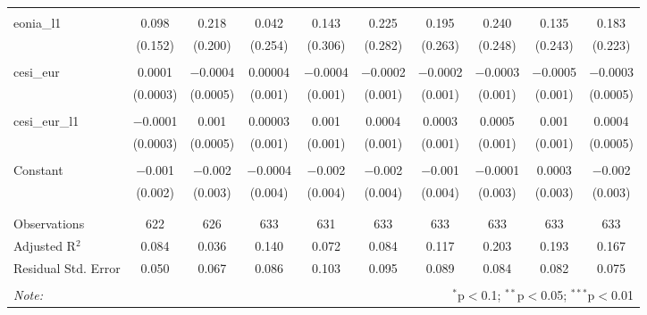 \begin{table}[!htbp]
\begin{adjustbox}{width=1.35\textwidth}
\begin{tabular}{@{\extracolsep{5pt}}lccccccccc}
  & & & & & & & & & \\ 
 eonia\_l1 & 0.098 & 0.218 & 0.042 & 0.143 & 0.225 & 0.195 & 0.240 & 0.135 & 0.183 \\ 
  & (0.152) & (0.200) & (0.254) & (0.306) & (0.282) & (0.263) & (0.248) & (0.243) & (0.223) \\ 
  & & & & & & & & & \\ 
 cesi\_eur & 0.0001 & $-$0.0004 & 0.00004 & $-$0.0004 & $-$0.0002 & $-$0.0002 & $-$0.0003 & $-$0.0005 & $-$0.0003 \\ 
  & (0.0003) & (0.0005) & (0.001) & (0.001) & (0.001) & (0.001) & (0.001) & (0.001) & (0.0005) \\ 
  & & & & & & & & & \\ 
 cesi\_eur\_l1 & $-$0.0001 & 0.001 & 0.00003 & 0.001 & 0.0004 & 0.0003 & 0.0005 & 0.001 & 0.0004 \\ 
  & (0.0003) & (0.0005) & (0.001) & (0.001) & (0.001) & (0.001) & (0.001) & (0.001) & (0.0005) \\ 
  & & & & & & & & & \\ 
 Constant & $-$0.001 & $-$0.002 & $-$0.0004 & $-$0.002 & $-$0.002 & $-$0.001 & $-$0.0001 & 0.0003 & $-$0.002 \\ 
  & (0.002) & (0.003) & (0.004) & (0.004) & (0.004) & (0.004) & (0.003) & (0.003) & (0.003) \\ 
  & & & & & & & & & \\ 
\hline \\[-1.8ex] 
Observations & 622 & 626 & 633 & 631 & 633 & 633 & 633 & 633 & 633 \\ 
Adjusted R$^{2}$ & 0.084 & 0.036 & 0.140 & 0.072 & 0.084 & 0.117 & 0.203 & 0.193 & 0.167 \\ 
Residual Std. Error & 0.050 & 0.067 & 0.086 & 0.103 & 0.095 & 0.089 & 0.084 & 0.082 & 0.075 \\ 
\hline 
\hline \\[-1.8ex] 
\textit{Note:}  & \multicolumn{9}{r}{$^{*}$p$<$0.1; $^{**}$p$<$0.05; $^{***}$p$<$0.01} \\ 
\end{tabular}
\end{adjustbox} 
\end{table} 
